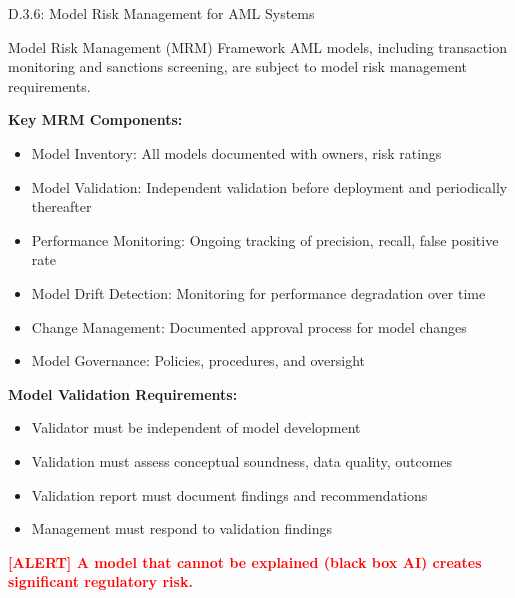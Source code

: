 \documentclass[11pt,a4paper]{beamer}
\newcommand{\redflag}[1]{\textcolor{red}{\textbf{[ALERT] #1}}}
\begin{document}
\begin{frame}{D.3.6: Model Risk Management for AML Systems}
	\begin{block}{Model Risk Management (MRM) Framework}
		AML models, including transaction monitoring and sanctions screening, are subject to model risk management requirements.
	\end{block}
	\textbf{Key MRM Components:}
	\begin{itemize}
		\item Model Inventory: All models documented with owners, risk ratings
		\item Model Validation: Independent validation before deployment and periodically thereafter
		\item Performance Monitoring: Ongoing tracking of precision, recall, false positive rate
		\item Model Drift Detection: Monitoring for performance degradation over time
		\item Change Management: Documented approval process for model changes
		\item Model Governance: Policies, procedures, and oversight
	\end{itemize}
	\textbf{Model Validation Requirements:}
	\begin{itemize}
		\item Validator must be independent of model development
		\item Validation must assess conceptual soundness, data quality, outcomes
		\item Validation report must document findings and recommendations
		\item Management must respond to validation findings
	\end{itemize}
	\redflag{A model that cannot be explained (black box AI) creates significant regulatory risk.}
\end{frame}
\end{document}
